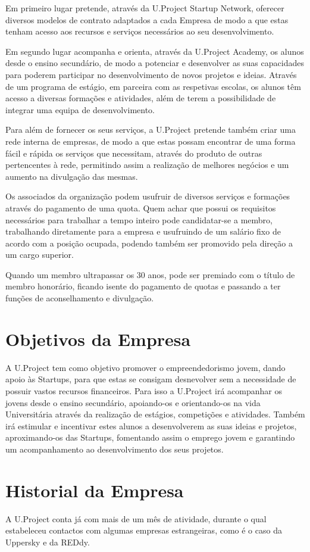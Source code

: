 \documentclass[11pt]{report}
\begin{document}
Em primeiro lugar pretende, através da U.Project Startup Network, oferecer diversos modelos de contrato adaptados a cada Empresa de modo a que estas tenham acesso aos recursos e serviços necessários ao seu desenvolvimento.

Em segundo lugar acompanha e orienta, através da U.Project Academy, os alunos desde o ensino secundário, de modo a potenciar e desenvolver as suas capacidades para poderem participar no desenvolvimento de novos projetos e ideias. Através de um programa de estágio, em parceira com as respetivas escolas, os alunos têm acesso a diversas formações e atividades, além de terem a possibilidade de integrar uma equipa de desenvolvimento.

Para além de fornecer os seus serviços, a U.Project pretende também criar uma rede interna de empresas, de modo a que estas possam encontrar de uma forma fácil e rápida os serviços que necessitam, através do produto de outras pertencentes à rede, permitindo assim a realização de melhores negócios e um aumento na divulgação das mesmas.

Os associados da organização podem usufruir de diversos serviços e formações através do pagamento de uma quota. Quem achar que possui os requisitos necessários para trabalhar a tempo inteiro pode candidatar-se a membro, trabalhando diretamente para a empresa e usufruindo de um salário fixo de acordo com a posição ocupada, podendo também ser promovido pela direção a um cargo superior.

Quando um membro ultrapassar os 30 anos, pode ser premiado com o título de membro honorário, ficando isente do pagamento de quotas e passando a ter funções de aconselhamento e divulgação.

\section{Objetivos da Empresa}
A U.Project tem como objetivo promover o empreendedorismo jovem, dando apoio às Startups, para que estas se consigam desnevolver sem a necessidade de possuir vastos recursos financeiros.
Para isso a U.Project irá acompanhar os jovens desde o ensino secundário, apoiando-os e orientando-os na vida Universitária através da realização de estágios, competições e atividades.
Também irá estimular e incentivar estes alunos a desenvolverem as suas ideias e projetos, aproximando-os das Startups, fomentando assim o emprego jovem e garantindo um acompanhamento ao desenvolvimento dos seus projetos.

\section{Historial da Empresa}
A U.Project conta já com mais de um mês de atividade, durante o qual estabeleceu contactos com algumas empresas estrangeiras, como é o caso da Uppersky e da REDdy.
\end{document}
